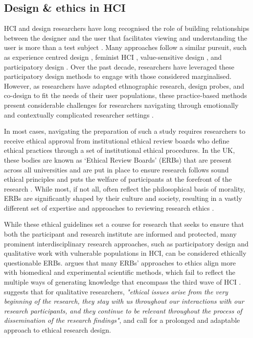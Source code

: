 \subsection{Design \& ethics in HCI}
\label{RelatedWork:DesignEthics}
HCI and design researchers have long recognised the role of building relationships between the designer and the user that facilitates viewing and understanding the user is more than a test subject \citep{wright2008empathy}. Many approaches follow a similar pursuit, such as experience centred design \citep{morrissey_value_2017}, feminist HCI \citep{bardzell_towards_2011}, value-sensitive design \citep{friedman_value-sensitive_1996}, and participatory design \citep{bannon2018introduction}. Over the past decade, researchers have leveraged these participatory design methods to engage with those considered marginalised. However, as researchers have adapted ethnographic research, design probes, and co-design to fit the needs of their user populations, these practice-based methods present considerable challenges for researchers navigating through emotionally and contextually complicated researcher settings \citep{vines_configuring_2013}.

In most cases, navigating the preparation of such a study requires researchers to receive ethical approval from institutional ethical review boards who define ethical practices through a set of institutional ethical procedures. In the UK, these bodies are known as ‘Ethical Review Boards’ (ERBs) that are present across all universities and are put in place to ensure research follows sound ethical principles and puts the welfare of participants at the forefront of the research \citep{pachana_can_2014}. While most, if not all, often reflect the philosophical basis of morality, ERBs are significantly shaped by their culture and society, resulting in a vastly different set of expertise and approaches to reviewing research ethics \citep{flicker_ethical_2007}.

While these ethical guidelines set a course for research that seeks to ensure that both the participant and research institute are informed and protected, many prominent interdisciplinary research approaches, such as participatory design and qualitative work with vulnerable populations in HCI, can be considered ethically questionable ERBs. \cite{bell_censorship_2014} argues that many ERBs’ approaches to ethics align more with biomedical and experimental scientific methods, which fail to reflect the multiple ways of generating knowledge that encompass the third wave of HCI \citep{bodker_when_2006,lazar_critical_2017}. \cite{carla_introducing_2013} suggests that for qualitative researchers,\textit{ "ethical issues arise from the very beginning of the research, they stay with us throughout our interactions with our research participants, and they continue to be relevant throughout the process of dissemination of the research findings"}, and call for a prolonged and adaptable approach to ethical research design. 

